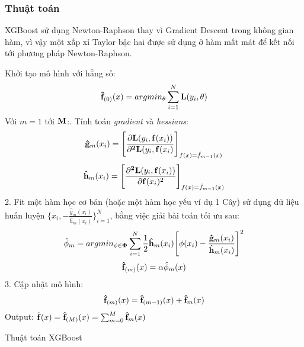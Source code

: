 \subsubsection{Thuật toán}
XGBoost sử dụng Newton-Raphson thay vì Gradient Descent trong không gian hàm, vì vậy một xấp xỉ Taylor bậc hai được sử dụng ở hàm mất mát để kết nối tới phương pháp Newton-Raphson.
\begin{algorithm}[h!]
    \DontPrintSemicolon
    Khởi tạo mô hình với hằng số:
    \begin{equation*}
        \bold{\hat{f}}_{(0)}(x) = argmin_{\theta}\sum^N_{i=1}\bold{L}(y_i,\bold{\theta})
    \end{equation*}\;
    Với $m = 1$ tới $\bold{M}$:. Tính toán \emph{gradient} và \emph{hessians}:
    \begin{equation*}
        \bold{\hat{g}}_m(x_i) = \Bigg[\frac{\bold{\partial}\bold{L}(y_i,\bold{f}(x_i))}{\bold{\partial^2}\bold{L}(y_i,\bold{f}(x_i)}\Bigg]_{f(x)=\hat{f}_{m-1}(x)}
    \end{equation*}
    \begin{equation*}
        \bold{\hat{h}}_m(x_i) = \Bigg[\frac{\bold{\partial^2}\bold{L}(y_i,\bold{f}(x_i))}{\bold{\partial}\bold{f}(x_i)^2}\Bigg]_{f(x)=\hat{f}_{m-1}(x)}
    \end{equation*}
    2. Fit một hàm học cơ bản (hoặc một hàm học yếu ví dụ 1 Cây) sử dụng dữ liệu huấn luyện $\Big\{x_i, -\frac{\hat{g}_m(x_i)}{\hat{h}_m(x_i)}\Big\}^N_{i=1}$, bằng việc giải bài toán tối ưu sau:
    \begin{equation*}
        \hat{\phi}_m = argmin_{\phi\in\bold{\Phi}}\sum^N_{i=1}\frac{1}{2}\bold{\hat{h}}_m(x_i)\Bigg[\phi(x_i)-\frac{\bold{\hat{g}}_m(x_i)}{\hat{\bold{h}}_m(x_i)}\Bigg]^2
    \end{equation*}
    \begin{equation*}
        \bold{\hat{f}}_{(m)}(x) = \alpha\hat{\phi}_m(x)
    \end{equation*}
    3. Cập nhật mô hình:
    \begin{equation*}
        \bold{\hat{f}}_{(m)}(x) = \bold{\hat{f}}_{(m-1)}(x) + \bold{\hat{f}}_m(x)
    \end{equation*}\;
    Output: $\hat{\bold{f}}(x) = \bold{\hat{f}}_{(M)}(x) = \sum^M_{m=0}\bold{\hat{f}}_m(x)$\;
    \caption{Thuật toán XGBoost}
    \label{alg:xgboost}
\end{algorithm}